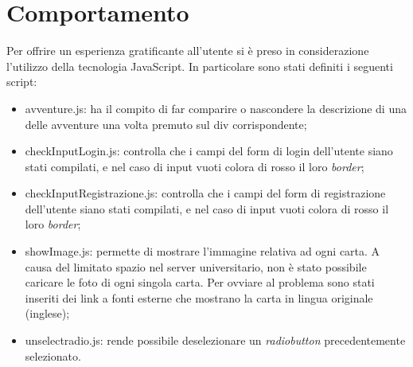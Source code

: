 \section{Comportamento}
Per offrire un esperienza gratificante all'utente si è preso in considerazione l'utilizzo della tecnologia JavaScript. In particolare sono stati definiti i seguenti script:\\
\begin{itemize}

	\item{avventure.js}: ha il compito di far comparire o nascondere la descrizione di una delle avventure una volta premuto sul div corrispondente;
	\item{checkInputLogin.js}: controlla che i campi del form di login dell'utente siano stati compilati, e nel caso di input vuoti colora di rosso il loro \textit{border};
	\item{checkInputRegistrazione.js}: controlla che i campi del form di registrazione dell'utente siano stati compilati, e nel caso di input vuoti colora di rosso il loro \textit{border};
	\item{showImage.js}: permette di mostrare l'immagine relativa ad ogni carta.  A causa del limitato spazio nel server universitario, non è stato possibile caricare le foto di ogni singola carta. Per ovviare al problema sono stati inseriti dei link a fonti esterne che mostrano la carta in lingua originale (inglese);
	\item{unselectradio.js}: rende possibile deselezionare un \textit{radiobutton} precedentemente selezionato.
\end{itemize}


\newpage